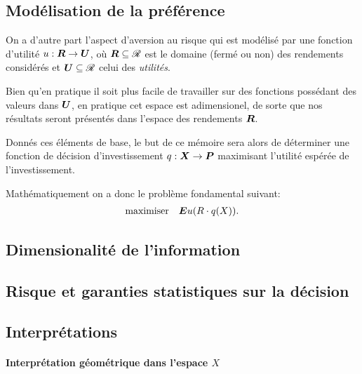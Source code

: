 \subsection{Modélisation de la préférence}

On a d'autre part l'aspect d'aversion au risque qui est modélisé par une fonction
d'utilité $u:\bm{R}\to\bm{U}$, où $\bm{R} \subseteq \mathscr{R}$ est le domaine (fermé ou non) des rendements considérés
et $\bm{U} \subseteq \mathscr{R}$ celui des \textit{utilités}.

Bien qu'en pratique il soit plus facile de travailler sur des fonctions possédant des
valeurs dans $\bm{U}$, en pratique cet espace est adimensionel\cit, de sorte que nos résultats
seront présentés dans l'espace des rendements $\bm{R}$.

Donnés ces éléments de base, le but de ce mémoire sera alors de déterminer une fonction de
décision d'investissement $q: \bm{X} \to \bm{P}$ maximisant l'utilité espérée de l'investissement.

Mathématiquement on a donc le problème fondamental suivant:
\begin{equation}
  \begin{array}{ll}\operatorname*{maximiser} & \displaystyle{\bm Eu(R \cdot q(X)).}\end{array}
\end{equation}



\subsection{Dimensionalité de l'information}




\subsection{Risque et garanties statistiques sur la décision}



\subsection{Interprétations}

\paragraph{Interprétation géométrique dans l'espace $X$}

